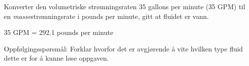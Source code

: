

Konverter den volumetriske strømningsraten 35 gallons per minute (35 GPM) til en {\it masse}strømningsrate i pounds per minute, gitt at fluidet er vann.







35 GPM = 292.1 pounds per minute

\vskip 10pt

Oppfølgingsspørsmål: Forklar hvorfor det er avgjørende å vite hvilken type fluid dette er for å kunne løse oppgaven.










